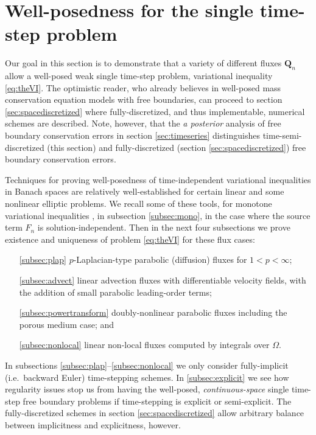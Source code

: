 \documentclass[final,leqno,onefignum,onetabnum]{siamltex1213bueler}
\newcommand\bQ{\mathbf{Q}}
\begin{document}
\section{Well-posedness for the single time-step problem} \label{sec:wellposed}  Our goal in this section is to demonstrate that a variety of different fluxes $\bQ_n$ allow a well-posed weak single time-step problem, variational inequality \eqref{eq:theVI}.  The optimistic reader, who already believes in well-posed mass conservation equation models with free boundaries, can proceed to section \ref{sec:spacediscretized} where fully-discretized, and thus implementable, numerical schemes are described.  Note, however, that the \emph{a posterior} analysis of free boundary conservation errors in section \ref{sec:timeseries} distinguishes time-semi-discretized (this section) and fully-discretized (section \ref{sec:spacediscretized}) free boundary conservation errors.

Techniques for proving well-posedness of time-independent variational inequalities in Banach spaces are relatively well-established for certain linear and some nonlinear elliptic problems.  We recall some of these tools, for monotone variational inequalities \cite{KinderlehrerStampacchia1980}, in subsection \ref{subsec:mono}, in the case where the source term $F_n$ is solution-independent.  Then in the next four subsections we prove existence and uniqueness of problem \eqref{eq:theVI} for these flux cases:
\begin{itemize}
\item[\ref{subsec:plap}] $p$-Laplacian-type parabolic (diffusion) fluxes for $1<p<\infty$;
\item[\ref{subsec:advect}] linear advection fluxes with differentiable velocity fields, with the addition of small parabolic leading-order terms;
\item[\ref{subsec:powertransform}] doubly-nonlinear parabolic fluxes including the porous medium case; and
\item[\ref{subsec:nonlocal}] linear non-local fluxes computed by integrals over $\Omega$.
\end{itemize}
In subsections \ref{subsec:plap}--\ref{subsec:nonlocal} we only consider fully-implicit (i.e.~backward Euler) time-stepping schemes.  In \ref{subsec:explicit} we see how regularity issues stop us from having the well-posed, \emph{continuous-space} single time-step free boundary problems if time-stepping is explicit or semi-explicit.  The fully-discretized schemes in section \ref{sec:spacediscretized} allow arbitrary balance between implicitness and explicitness, however.
\end{document}
